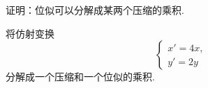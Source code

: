 
\begin{example}
证明：位似可以分解成某两个压缩的乘积.
\end{example}

\begin{example}
将仿射变换\begin{equation*}
	\begin{cases}
		x' = 4x, \\
		y' = 2y
	\end{cases}
\end{equation*}
分解成一个压缩和一个位似的乘积.
\end{example}
